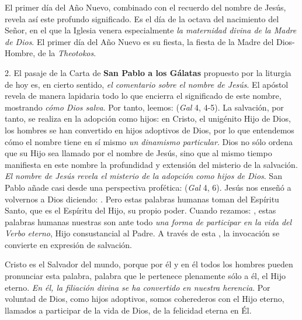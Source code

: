 \begin{body}
	El primer día del Año Nuevo, combinado con el recuerdo del nombre de Jesús, revela así este profundo significado. Es el día de la octava del nacimiento del Señor, en el que la Iglesia venera especialmente \emph{la maternidad divina de la Madre de Dios}. El primer día del Año Nuevo es su fiesta, la fiesta de la Madre del Dios-Hombre, de la \emph{Theotokos}.
	
	2. El pasaje de la Carta de \textbf{San Pablo a los Gálatas} propuesto por la liturgia de hoy es, en cierto sentido, \emph{el comentario sobre el nombre de Jesús}. El apóstol revela de manera lapidaria todo lo que encierra el significado de este nombre, mostrando \emph{cómo Dios salva}. Por tanto, leemos:  (\emph{Gal} 4, 4-5). La salvación, por tanto, se realiza en la adopción como hijos: en Cristo, el unigénito Hijo de Dios, los hombres se han convertido en hijos adoptivos de Dios, por lo que entendemos cómo el nombre  tiene en sí mismo \emph{un dinamismo particular}. Dios no sólo ordena que su Hijo sea llamado por el nombre de Jesús, sino que al mismo tiempo manifiesta en este nombre la profundidad y extensión del misterio de la salvación. \emph{El nombre de Jesús revela el misterio de la adopción como hijos de Dios}. San Pablo añade casi desde una perspectiva profética:  (\emph{Gal} 4, 6). Jesús nos enseñó a volvernos a Dios diciendo: . Pero estas palabras humanas toman del Espíritu Santo, que es el Espíritu del Hijo, su propio poder. Cuando rezamos: , estas palabras humanas nuestras son ante todo \emph{una forma de participar en la vida del Verbo eterno}, Hijo consustancial al Padre. A través de esta , la invocación  se convierte en expresión de salvación.
	
	Cristo es el Salvador del mundo, porque por él y en él todos los hombres pueden pronunciar esta palabra, palabra que le pertenece plenamente sólo a él, el Hijo eterno. \emph{En él, la filiación divina se ha convertido en nuestra herencia}. Por voluntad de Dios, como hijos adoptivos, somos coherederos con el Hijo eterno, llamados a participar de la vida de Dios, de la felicidad eterna en Él.
	

\end{body}

